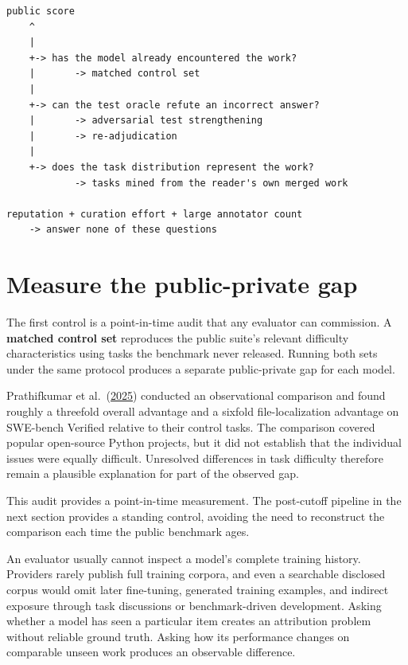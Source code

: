 \begin{verbatim}
public score
    ^
    |
    +-> has the model already encountered the work?
    |       -> matched control set
    |
    +-> can the test oracle refute an incorrect answer?
    |       -> adversarial test strengthening
    |       -> re-adjudication
    |
    +-> does the task distribution represent the work?
            -> tasks mined from the reader's own merged work

reputation + curation effort + large annotator count
    -> answer none of these questions
\end{verbatim}

\section{Measure the public-private gap}\label{measure-the-public-private-gap}

The first control is a point-in-time audit that any evaluator can commission. A \textbf{matched control set} reproduces the public suite's relevant difficulty characteristics using tasks the benchmark never released. Running both sets under the same protocol produces a separate public-private gap for each model.

Prathifkumar et al.~(\href{https://arxiv.org/abs/2512.10218}{2025}) conducted an observational comparison and found roughly a threefold overall advantage and a sixfold file-localization advantage on SWE-bench Verified relative to their control tasks. The comparison covered popular open-source Python projects, but it did not establish that the individual issues were equally difficult. Unresolved differences in task difficulty therefore remain a plausible explanation for part of the observed gap.

This audit provides a point-in-time measurement. The post-cutoff pipeline in the next section provides a standing control, avoiding the need to reconstruct the comparison each time the public benchmark ages.

An evaluator usually cannot inspect a model's complete training history. Providers rarely publish full training corpora, and even a searchable disclosed corpus would omit later fine-tuning, generated training examples, and indirect exposure through task discussions or benchmark-driven development. Asking whether a model has seen a particular item creates an attribution problem without reliable ground truth. Asking how its performance changes on comparable unseen work produces an observable difference.

